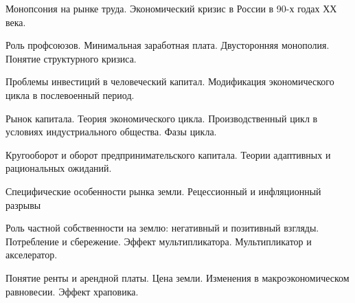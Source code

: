 \z 	Монопсония на рынке труда.
 \medskip
\z 	Экономический кризис в России в 90-х годах ХХ века.
 \medskip

\newpage


\shapkFull
\setcounter{zad}{0}

\z 	Роль профсоюзов. Минимальная заработная плата.  Двусторонняя монополия.
 \medskip
\z 	Понятие структурного кризиса.
 \medskip

\newpage


\shapkFull
\setcounter{zad}{0}

\z 	Проблемы инвестиций в человеческий капитал.
 \medskip
\z 	Модификация экономического цикла в послевоенный период.
 \medskip

\newpage


\shapkFull
\setcounter{zad}{0}

\z 	 Рынок капитала.
 \medskip
\z 	Теория экономического цикла. Производственный цикл в условиях индустриального общества. Фазы цикла.
 \medskip

\newpage


\shapkFull
\setcounter{zad}{0}

\z 	Кругооборот и оборот предпринимательского капитала.
 \medskip
\z 	Теории адаптивных и рациональных ожиданий. 
 \medskip

\newpage


\shapkFull
\setcounter{zad}{0}

\z 	Специфические особенности рынка земли.
 \medskip
\z 	Рецессионный и инфляционный разрывы
 \medskip

\newpage


\shapkFull
\setcounter{zad}{0}

\z 	Роль частной собственности на землю: негативный и позитивный взгляды.
 \medskip
\z 	Потребление и сбережение. Эффект мультипликатора. Мультипликатор и акселератор.
 \medskip

\newpage


\shapkFull
\setcounter{zad}{0}

\z 	Понятие ренты и арендной платы. Цена земли.
 \medskip
\z 	Изменения в макроэкономическом равновесии.  Эффект храповика.
 \medskip

